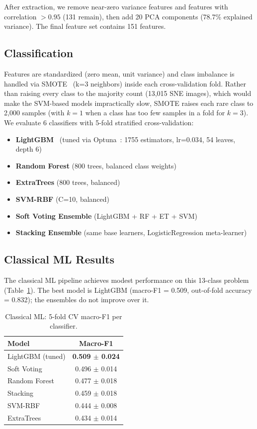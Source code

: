 \documentclass[twocolumn,a4paper]{article}
\begin{document}
After extraction, we remove near-zero variance features and features with correlation $> 0.95$ (131 remain), then add 20 PCA components (78.7\% explained variance). The final feature set contains 151 features.

\subsection{Classification}

Features are standardized (zero mean, unit variance) and class imbalance is handled via SMOTE~\cite{chawla2002smote} (k=3 neighbors) inside each cross-validation fold. Rather than raising every class to the majority count (13,015 SNE images), which would make the SVM-based models impractically slow, SMOTE raises each rare class to 2,000 samples (with $k=1$ when a class has too few samples in a fold for $k=3$). We evaluate 6 classifiers with 5-fold stratified cross-validation:

\begin{itemize}
    \item \textbf{LightGBM}~\cite{ke2017lightgbm} (tuned via Optuna~\cite{akiba2019optuna}: 1755 estimators, lr=0.034, 54 leaves, depth 6)
    \item \textbf{Random Forest} (800 trees, balanced class weights)
    \item \textbf{ExtraTrees} (800 trees, balanced)
    \item \textbf{SVM-RBF} (C=10, balanced)
    \item \textbf{Soft Voting Ensemble} (LightGBM + RF + ET + SVM)
    \item \textbf{Stacking Ensemble} (same base learners, LogisticRegression meta-learner)
\end{itemize}

\subsection{Classical ML Results}

The classical ML pipeline achieves modest performance on this 13-class problem (Table~\ref{tab:classical_results}). The best model is LightGBM (macro-F1 = 0.509, out-of-fold accuracy = 0.832); the ensembles do not improve over it.

\begin{table}[htbp]
\centering
\caption{Classical ML: 5-fold CV macro-F1 per classifier.}
\label{tab:classical_results}
\small
\begin{tabular}{lc}
\toprule
\textbf{Model} & \textbf{Macro-F1} \\
\midrule
LightGBM (tuned) & \textbf{0.509 $\pm$ 0.024} \\
Soft Voting & 0.496 $\pm$ 0.014 \\
Random Forest & 0.477 $\pm$ 0.018 \\
Stacking & 0.459 $\pm$ 0.018 \\
SVM-RBF & 0.444 $\pm$ 0.008 \\
ExtraTrees & 0.434 $\pm$ 0.014 \\
\bottomrule
\end{tabular}
\end{table}
\end{document}
